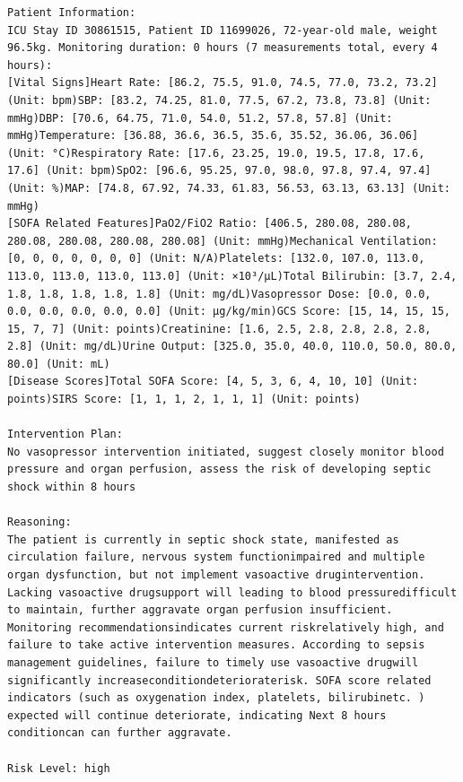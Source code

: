 \documentclass{article}
\begin{document}
\begin{lstlisting}[caption={Result for Patient 30861515}, label={lst:30861515}]
Patient Information:
ICU Stay ID 30861515, Patient ID 11699026, 72-year-old male, weight 96.5kg. Monitoring duration: 0 hours (7 measurements total, every 4 hours):
[Vital Signs]Heart Rate: [86.2, 75.5, 91.0, 74.5, 77.0, 73.2, 73.2] (Unit: bpm)SBP: [83.2, 74.25, 81.0, 77.5, 67.2, 73.8, 73.8] (Unit: mmHg)DBP: [70.6, 64.75, 71.0, 54.0, 51.2, 57.8, 57.8] (Unit: mmHg)Temperature: [36.88, 36.6, 36.5, 35.6, 35.52, 36.06, 36.06] (Unit: °C)Respiratory Rate: [17.6, 23.25, 19.0, 19.5, 17.8, 17.6, 17.6] (Unit: bpm)SpO2: [96.6, 95.25, 97.0, 98.0, 97.8, 97.4, 97.4] (Unit: %)MAP: [74.8, 67.92, 74.33, 61.83, 56.53, 63.13, 63.13] (Unit: mmHg)
[SOFA Related Features]PaO2/FiO2 Ratio: [406.5, 280.08, 280.08, 280.08, 280.08, 280.08, 280.08] (Unit: mmHg)Mechanical Ventilation: [0, 0, 0, 0, 0, 0, 0] (Unit: N/A)Platelets: [132.0, 107.0, 113.0, 113.0, 113.0, 113.0, 113.0] (Unit: ×10³/μL)Total Bilirubin: [3.7, 2.4, 1.8, 1.8, 1.8, 1.8, 1.8] (Unit: mg/dL)Vasopressor Dose: [0.0, 0.0, 0.0, 0.0, 0.0, 0.0, 0.0] (Unit: μg/kg/min)GCS Score: [15, 14, 15, 15, 15, 7, 7] (Unit: points)Creatinine: [1.6, 2.5, 2.8, 2.8, 2.8, 2.8, 2.8] (Unit: mg/dL)Urine Output: [325.0, 35.0, 40.0, 110.0, 50.0, 80.0, 80.0] (Unit: mL)
[Disease Scores]Total SOFA Score: [4, 5, 3, 6, 4, 10, 10] (Unit: points)SIRS Score: [1, 1, 1, 2, 1, 1, 1] (Unit: points)

Intervention Plan:
No vasopressor intervention initiated, suggest closely monitor blood pressure and organ perfusion, assess the risk of developing septic shock within 8 hours

Reasoning:
The patient is currently in septic shock state, manifested as circulation failure, nervous system functionimpaired and multiple organ dysfunction, but not implement vasoactive drugintervention. Lacking vasoactive drugsupport will leading to blood pressuredifficult to maintain, further aggravate organ perfusion insufficient. Monitoring recommendationsindicates current riskrelatively high, and failure to take active intervention measures. According to sepsis management guidelines, failure to timely use vasoactive drugwill significantly increaseconditiondeterioraterisk. SOFA score related indicators (such as oxygenation index, platelets, bilirubinetc. ) expected will continue deteriorate, indicating Next 8 hours conditioncan can further aggravate.

Risk Level: high
\end{lstlisting}
\end{document}
